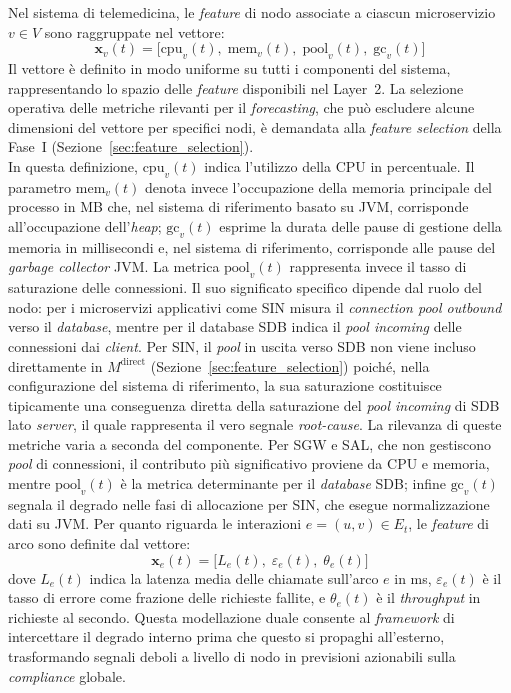 Nel sistema di telemedicina, le \textit{feature} di nodo associate a ciascun microservizio
$v \in V$ sono raggruppate nel vettore:
\begin{equation}
\label{eq:node_features}
\mathbf{x}_v(t) = \bigl[\text{cpu}_v(t),\; \text{mem}_v(t),\; \text{pool}_v(t),\; \text{gc}_v(t)\bigr]
\end{equation}
Il vettore è definito in modo uniforme su tutti i componenti del sistema, rappresentando lo spazio
delle \textit{feature} disponibili nel Layer~2. La selezione operativa delle metriche rilevanti per
il \textit{forecasting}, che può escludere alcune dimensioni del vettore per specifici nodi, è
demandata alla \textit{feature selection} della Fase~I (Sezione~\ref{sec:feature_selection}). \\
In questa definizione, $\text{cpu}_v(t)$ indica l'utilizzo della \gls{CPU} in percentuale. 
Il parametro $\text{mem}_v(t)$ denota invece l'occupazione della memoria principale del processo in MB che, 
nel sistema di riferimento basato su \gls{JVM}, corrisponde all'occupazione dell'\textit{heap}; 
$\text{gc}_v(t)$ esprime la durata delle pause di gestione della memoria in millisecondi e, 
nel sistema di riferimento, corrisponde alle pause del \textit{garbage collector} \gls{JVM}.
La metrica $\text{pool}_v(t)$ rappresenta invece il tasso di saturazione delle connessioni. 
Il suo significato specifico dipende dal ruolo del nodo: per i microservizi applicativi come 
SIN misura il \textit{connection pool outbound} verso il \textit{database}, 
mentre per il database SDB indica il \textit{pool incoming} delle connessioni dai \textit{client}. 
Per SIN, il \textit{pool} in uscita verso SDB non viene incluso direttamente in $M^{\text{direct}}$ 
(Sezione~\ref{sec:feature_selection}) poiché, nella configurazione del sistema di riferimento, 
la sua saturazione costituisce tipicamente una conseguenza diretta della saturazione del \textit{pool incoming} 
di SDB lato \textit{server}, il quale rappresenta il vero segnale \textit{root-cause}. 
La rilevanza di queste metriche varia a
seconda del componente. Per SGW e SAL, che non gestiscono \textit{pool} di connessioni, il
contributo più significativo proviene da \gls{CPU} e memoria, mentre $\text{pool}_v(t)$ è la
metrica determinante per il \textit{database} SDB; infine $\text{gc}_v(t)$ segnala il degrado
nelle fasi di allocazione per SIN, che esegue normalizzazione dati su \gls{JVM}. 
Per quanto riguarda le interazioni $e = (u,v) \in E_t$, le \textit{feature} di arco sono definite dal vettore:
\begin{equation}
\label{eq:edge_features}
\mathbf{x}_e(t) = \bigl[L_e(t),\; \varepsilon_e(t),\; \theta_e(t)\bigr]
\end{equation}
dove $L_e(t)$ indica la latenza media delle chiamate sull'arco $e$ in ms, $\varepsilon_e(t)$ è il
tasso di errore come frazione delle richieste fallite, e $\theta_e(t)$ è il \textit{throughput} in
richieste al secondo.
Questa modellazione duale consente al \textit{framework} di intercettare il degrado interno prima
che questo si propaghi all'esterno, trasformando segnali deboli a livello di nodo in previsioni
azionabili sulla \textit{compliance} globale.

